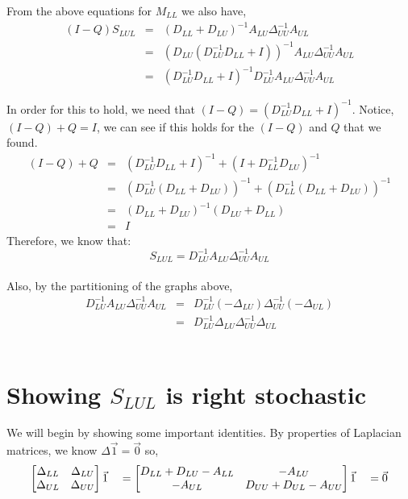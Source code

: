 \documentclass[a4paper]{article}
\begin{document}
From the above equations for $M_{LL}$ we also have,
\begin{eqnarray}
\left(I - Q\right)S_{LUL} & = & \left(D_{LL} + D_{LU}\right)^{-1}A_{LU}\Delta_{UU}^{-1}A_{UL} \nonumber \\
& = & \left(D_{LU}\left(D_{LU}^{-1}D_{LL} + I\right)\right)^{-1}A_{LU}\Delta_{UU}^{-1}A_{UL} \nonumber \\
& = & \left(D_{LU}^{-1}D_{LL} + I \right)^{-1}D_{LU}^{-1}A_{LU}\Delta_{UU}^{-1}A_{UL} \nonumber 
\end{eqnarray}

In order for this to hold, we need that
$\left(I - Q\right) = \left(D_{LU}^{-1}D_{LL} + I \right)^{-1}$. 
Notice, $\left(I-Q\right)+Q = I$, we can see if this holds for the
$\left(I-Q\right)$ and $Q$ that we found.
\begin{eqnarray}
\left(I-Q\right) + Q &=& \left(D_{LU}^{-1}D_{LL} + I \right)^{-1} +
\left(I + D_{LL}^{-1}D_{LU}\right)^{-1} \nonumber \\ 
&=& \left(D_{LU}^{-1}\left(D_{LL} + D_{LU}\right)\right)^{-1} +
\left(D_{LL}^{-1}\left(D_{LL} + D_{LU}\right)\right)^{-1} \nonumber \\ 
&=& \left(D_{LL} + D_{LU}\right)^{-1} \left(D_{LU} + D_{LL}\right) \nonumber \\
&=& I
\end{eqnarray}
Therefore, we know that:
\begin{equation*}
S_{LUL} = D_{LU}^{-1}A_{LU}\Delta_{UU}^{-1}A_{UL} 
\end{equation*}\\
Also, by the partitioning of the graphs above,\\
\begin{eqnarray}
D_{LU}^{-1}A_{LU}\Delta_{UU}^{-1}A_{UL} &=& D_{LU}^{-1}\left(-\Delta_{LU}\right)\Delta_{UU}^{-1}\left(-\Delta_{UL}\right) \nonumber \\ 
&=& D_{LU}^{-1}\Delta_{LU}\Delta_{UU}^{-1}\Delta_{UL} \nonumber 
\end{eqnarray}\\

\section{Showing $S_{LUL}$ is right stochastic}

We will begin by showing some important identities. 
By properties of Laplacian matrices, we know $\Delta
\vec{1} = \vec{0}$ so,
\begin{equation*}
\begin{bmatrix}
     \Delta_{LL} & \Delta_{LU} \\
     \Delta_{UL} & \Delta_{UU} 
\end{bmatrix}
\vec{1}
\quad
=
\begin{bmatrix}
     D_{LL} + D_{LU} - A_{LL} & -A_{LU} \\
     -A_{UL} & D_{UU} + D_{UL} - A_{UU}
\end{bmatrix}\\
\vec{1}
\quad 
= 
\vec{0}
\end{equation*}
\end{document}
